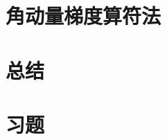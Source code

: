 \section{角动量梯度算符法}
\label{sec:5.4 The Ladder-Operator Method for Angular Momentum}

\section*{总结}

\section*{习题}